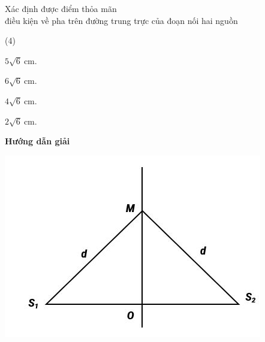 \begin{dang}{Xác định được điểm thỏa mãn\\ điều kiện về pha trên đường trung trực của đoạn nối hai nguồn}
{		\begin{mcq}(4)
			\item $5\sqrt 6\ \text{cm}$.
			\item $6\sqrt 6\ \text{cm}$.
			\item $4\sqrt 6\ \text{cm}$.
			\item $2\sqrt 6\ \text{cm}$.
		\end{mcq}
	}
	{\begin{center}
			\textbf{Hướng dẫn giải}
			
			\vspace*{1em}
			\includegraphics[scale=0.7]{../figs/VN12-PH-11-A-007-3-V2-3.JPG}
		\end{center}
		
}
\end{dang}
